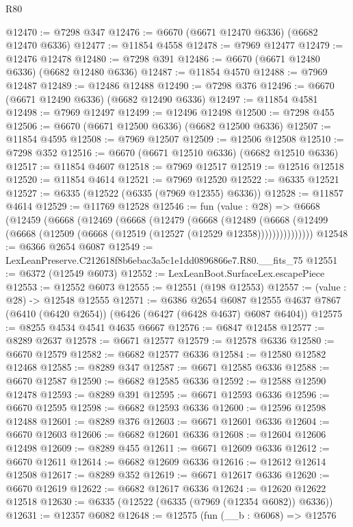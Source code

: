 \begin{lexlean}{R80}
\begin{coremodule}
@12470 := @7298 @347
@12476 := @6670 (@6671 @12470 @6336) (@6682 @12470 @6336)
@12477 := @11854 @4558
@12478 := @7969 @12477
@12479 := @12476 @12478
@12480 := @7298 @391
@12486 := @6670 (@6671 @12480 @6336) (@6682 @12480 @6336)
@12487 := @11854 @4570
@12488 := @7969 @12487
@12489 := @12486 @12488
@12490 := @7298 @376
@12496 := @6670 (@6671 @12490 @6336) (@6682 @12490 @6336)
@12497 := @11854 @4581
@12498 := @7969 @12497
@12499 := @12496 @12498
@12500 := @7298 @455
@12506 := @6670 (@6671 @12500 @6336) (@6682 @12500 @6336)
@12507 := @11854 @4595
@12508 := @7969 @12507
@12509 := @12506 @12508
@12510 := @7298 @352
@12516 := @6670 (@6671 @12510 @6336) (@6682 @12510 @6336)
@12517 := @11854 @4607
@12518 := @7969 @12517
@12519 := @12516 @12518
@12520 := @11854 @4614
@12521 := @7969 @12520
@12522 := @6335 @12521
@12527 := @6335 (@12522 (@6335 (@7969 @12355) @6336))
@12528 := @11857 @4614
@12529 := @11769 @12528
@12546 := fun (value : @28) =>
  @6668
    (@12459
      (@6668
        (@12469
          (@6668
            (@12479
              (@6668
                (@12489
                  (@6668 (@12499 (@6668 (@12509 (@6668 (@12519 (@12527 (@12529 @12358)))))))))))))))
@12548 := @6366 @2654 @6087
@12549 := LexLeanPreserve.C212618f8b6ebac3a5c1e1dd0896866e7.R80.__fits_75
@12551 := @6372 (@12549 @6073)
@12552 := LexLeanBoot.SurfaceLex.escapePiece
@12553 := @12552 @6073
@12555 := @12551 (@198 @12553)
@12557 := (value : @28) -> @12548 @12555
@12571 := @6386
    @2654
    @6087
    @12555
    @4637
    @7867
    (@6410 (@6420 @2654))
    (@6426 (@6427 (@6428 @4637) @6087 @6404))
@12575 := @8255 @4534 @4541 @4635 @6667
@12576 := @6847 @12458
@12577 := @8289 @2637
@12578 := @6671 @12577
@12579 := @12578 @6336
@12580 := @6670 @12579
@12582 := @6682 @12577 @6336
@12584 := @12580 @12582 @12468
@12585 := @8289 @347
@12587 := @6671 @12585 @6336
@12588 := @6670 @12587
@12590 := @6682 @12585 @6336
@12592 := @12588 @12590 @12478
@12593 := @8289 @391
@12595 := @6671 @12593 @6336
@12596 := @6670 @12595
@12598 := @6682 @12593 @6336
@12600 := @12596 @12598 @12488
@12601 := @8289 @376
@12603 := @6671 @12601 @6336
@12604 := @6670 @12603
@12606 := @6682 @12601 @6336
@12608 := @12604 @12606 @12498
@12609 := @8289 @455
@12611 := @6671 @12609 @6336
@12612 := @6670 @12611
@12614 := @6682 @12609 @6336
@12616 := @12612 @12614 @12508
@12617 := @8289 @352
@12619 := @6671 @12617 @6336
@12620 := @6670 @12619
@12622 := @6682 @12617 @6336
@12624 := @12620 @12622 @12518
@12630 := @6335 (@12522 (@6335 (@7969 (@12354 @6082)) @6336))
@12631 := @12357 @6082
@12648 := @12575
    (fun (__b : @6068) =>
    @12576

\end{coremodule}
\end{lexlean}
